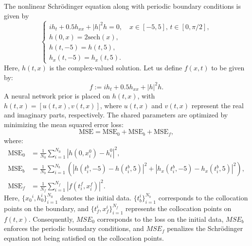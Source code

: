 \documentclass[lang=cn,a4paper,newtx]{elegantpaper}
\newcommand{\sech}{\text{sech}}
\begin{document}
\begin{example}
    The nonlinear Schrödinger equation along with periodic boundary conditions is given by
\begin{equation}\label{eq:PINN-NLS}
    \begin{cases}
        i h_t + 0.5 h_{xx} + |h|^2 h = 0, \quad x \in [-5, 5], \, t \in [0, \pi/2], \\
        h(0, x) = 2 \sech{(x)}, \\
        h(t, -5) = h(t, 5), \\
        h_x(t, -5) = h_x(t, 5).
    \end{cases}
\end{equation}
Here, $ h(t, x) $ is the complex-valued solution. Let us define $ f(x,t) $ to be given by:
\begin{equation}
    f := i h_t + 0.5 h_{xx} + |h|^2 h.
\end{equation}
A neural network prior is placed on \( h(t, x) \), with \( h(t, x) = [u(t, x), v(t, x)] \), where \( u(t, x) \) and \( v(t, x) \) represent the real and imaginary parts, respectively. The shared parameters are optimized by minimizing the mean squared error loss:
\begin{equation}\label{eq:PINN-NLS-Loss}
    \text{MSE} = \text{MSE}_0 + \text{MSE}_b + \text{MSE}_f,
\end{equation}
where:
\begin{equation*}
    \begin{aligned}
        \text{MSE}_0 &= \frac{1}{N_0} \sum_{i=1}^{N_0} |h(0, x_i^0) - h_i^0|^2, \\
        \text{MSE}_b &= \frac{1}{N_b} \sum_{i=1}^{N_b} \left( |h(t_i^b, -5) - h(t_i^b, 5)|^2 + |h_x(t_i^b, -5) - h_x(t_i^b, 5)|^2 \right), \\
        \text{MSE}_f &= \frac{1}{N_f} \sum_{i=1}^{N_f} |f(t_i^f, x_i^f)|^2.
    \end{aligned}
\end{equation*}
Here, $ \{x_{0}{^i}, h_{0}^{i}\}_{i=1}^{N_{0}} $ denotes the initial data. $ \{t_{b}^{i}\}_{i=1}^{N_{b}} $ corresponds to the collocation points on the boundary, and $ \{t_{f}^{i}, x_{f}^{i}\}_{i=1}^{N_{f}} $ represents the collocation points on $ f(t, x) $. Consequently, $ MSE_{0} $ corresponds to the loss on the initial data, $ MSE_{b} $ enforces the periodic boundary conditions, and $ MSE_{f} $ penalizes the Schrödinger equation not being satisfied on the collocation points. 
\end{example}
\end{document}
